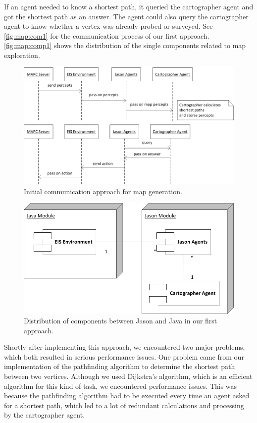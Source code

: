 If an agent needed to know a shortest path, it queried the cartographer agent and got the shortest path as an answer.
The agent could also query the cartographer agent to know whether a vertex was already probed or surveyed.
See \autoref{fig:map:com1} for the communication process of our first approach.
\autoref{fig:map:comp1} shows the distribution of the single components related to map exploration.
\begin{figure}
  \centering
  \includegraphics[width=\linewidth]{images/map_com_1.png}
  \caption{Initial communication approach for map generation.}
  \label{fig:map:com1}
\end{figure}

\begin{figure}
  \centering
  \includegraphics[width=0.7\linewidth]{images/map_comp_1.png}
  \caption{Distribution of components between Jason and Java in our first approach.}
  \label{fig:map:comp1}
\end{figure}

Shortly after implementing this approach, we encountered two major problems, which both resulted in serious performance issues.
One problem came from our implementation of the pathfinding algorithm to determine the shortest path between two vertices.
Although we used Dijkstra's algorithm, which is an efficient algorithm for this kind of task, we encountered performance issues.
This was because the pathfinding algorithm had to be executed every time an agent asked for a shortest path, which led to a lot of redundant calculations and processing by the cartographer agent.

